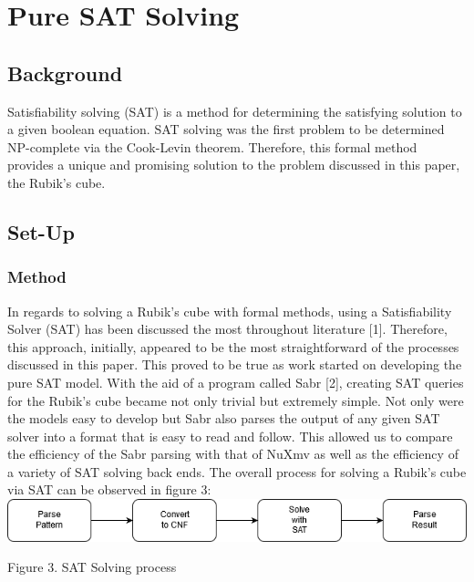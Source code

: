 \documentclass{article}
\begin{document}
\section{Pure SAT Solving}
\subsection{Background}
Satisfiability solving (SAT) is a method for determining the satisfying solution to a given boolean equation. SAT solving was the first problem to be determined NP-complete via the Cook-Levin theorem. Therefore, this formal method provides a unique and promising solution to the problem discussed in this paper, the Rubik's cube.
\subsection{Set-Up}
\subsubsection{Method}
In regards to solving a Rubik’s cube with formal methods, using a Satisfiability Solver (SAT) has been discussed the most throughout literature [1]. Therefore, this approach, initially, appeared to be the most straightforward of the processes discussed in this paper. This proved to be true as work started on developing the pure SAT model. With the aid of a program called Sabr [2], creating SAT queries for the Rubik’s cube became not only trivial but extremely simple. Not only were the models easy to develop but Sabr also parses the output of any given SAT solver into a format that is easy to read and follow. This allowed us to compare the efficiency of the Sabr parsing with that of NuXmv as well as the efficiency of a variety of SAT solving back ends. The overall process for solving a Rubik’s cube via SAT can be observed in figure 3: \\[7mm]
\includegraphics[width=1\textwidth, center]{pics/satfigure1.png} \\
\begin{center}
Figure 3. SAT Solving process \\[7mm]
\end{center}
\end{document}
